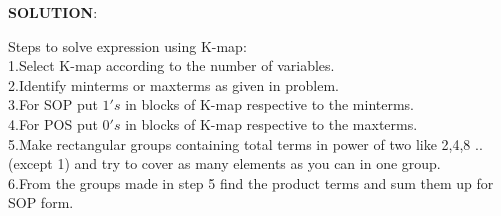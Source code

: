 \documentclass[10pt,a4paper]{report}
\begin{document}
\begin{multicols}{2}
\newenvironment{Karnaugh}%
{
\begin{tikzpicture}[baseline=(current bounding box.north),scale=0.8]
\draw (0,0) grid (4,4);
\draw (0,4) -- node [pos=0.7,above right,anchor=south west] {ZW} node [pos=0.7,below left,anchor=north east] {XY} ++(135:1);
%
\matrix (mapa) [matrix of nodes,
        column sep={0.8cm,between origins},
        row sep={0.8cm,between origins},
        every node/.style={minimum size=0.3mm},
        anchor=8.center,
        ampersand replacement=\&] at (0.5,0.5)
{
                       \& |(c00)| 00         \& |(c01)| 01         \& |(c11)| 11         \& |(c10)| 10         \& |(cf)| \phantom{00} \\
|(r00)| 00             \& |(0)|  \phantom{0} \& |(1)|  \phantom{0} \& |(3)|  \phantom{0} \& |(2)|  \phantom{0} \&                     \\
|(r01)| 01             \& |(4)|  \phantom{0} \& |(5)|  \phantom{0} \& |(7)|  \phantom{0} \& |(6)|  \phantom{0} \&                     \\
|(r11)| 11             \& |(12)| \phantom{0} \& |(13)| \phantom{0} \& |(15)| \phantom{0} \& |(14)| \phantom{0} \&                     \\
|(r10)| 10             \& |(8)|  \phantom{0} \& |(9)|  \phantom{0} \& |(11)| \phantom{0} \& |(10)| \phantom{0} \&                     \\
|(rf) | \phantom{00}   \&                    \&                    \&                    \&                    \&                     \\
};
}%
{
\end{tikzpicture}
}




\newcommand{\contingut}[1]{%
\foreach \x [count=\xi from 0]  in {#1}
     \path (\xi) node {\x};
}

\newcommand{\minterms}[1]{%
    \foreach \x in {#1}
        \path (\x) node {1};
}

\newcommand{\maxterms}[1]{%
    \foreach \x in {#1}
        \path (\x) node {0};
}

\newcommand{\indeterminats}[1]{%
    \foreach \x in {#1}
        \path (\x) node {X};
}
\raggedright \textbf{SOLUTION}:\vspace{2mm}
\raggedright Steps to solve expression using K-map:\\1.Select K-map according to the number of variables.
\\2.Identify minterms or maxterms as given in problem.
\\3.For SOP put $1's$ in blocks of K-map respective to the minterms.
\\4.For POS put $0's$ in blocks of K-map respective to the maxterms.
\\5.Make rectangular groups containing total terms in power of two like 2,4,8 ..(except 1) and try to cover as many elements as you can in one group.
\\6.From the groups made in step 5 find the product terms and sum them up for SOP form.



\end{multicols}
\end{document}
